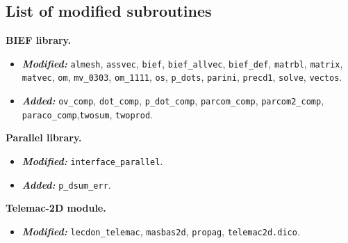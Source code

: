 \subsection*{List of modified subroutines}
\begin{description}

%
\item \textbf{BIEF library.} 
\begin{itemize}
\item \textbf{\textit{Modified:}}
\texttt{almesh}, \texttt{assvec}, \texttt{bief}, \texttt{bief\_allvec}, \texttt{bief\_def}, \texttt{matrbl}, \texttt{matrix},
\texttt{matvec}, \texttt{om}, \texttt{mv\_0303}, \texttt{om\_1111}, \texttt{os}, \texttt{p\_dots}, \texttt{parini}, \texttt{precd1},
\texttt{solve}, \texttt{vectos}.
\item \textbf{\textit{Added:}}
\texttt{ov\_comp}, \texttt{dot\_comp}, \texttt{p\_dot\_comp}, \texttt{parcom\_comp}, \texttt{parcom2\_comp}, 
\texttt{paraco\_comp},\texttt{twosum}, \texttt{twoprod}.
\end{itemize}
%
\item \textbf{Parallel library.}
\begin{itemize}
\item \textbf{\textit{Modified:}} \texttt{interface\_parallel}.
\item \textbf{\textit{Added:}} \texttt{p\_dsum\_err}.
\end{itemize}
%
\item \textbf{Telemac-2D module.}
\begin{itemize}
\item \textbf{\textit{Modified:}}
\texttt{lecdon\_telemac}, \texttt{masbas2d}, \texttt{propag}, \texttt{telemac2d.dico}.
\end{itemize}
%
\end{description}

